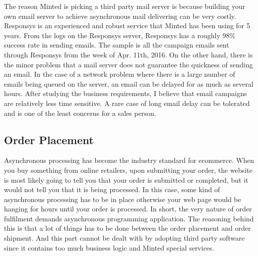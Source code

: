 \documentclass[12pt]{article}
\begin{document}
The reason Minted is picking a third party mail server is because building your own email server to achieve asynchronous mail delivering can be very costly. Responsys is an experienced and robust service that Minted has been using for 5 years. From the logs on the Responsys server, Responsys has a roughly 98\% success rate in sending emails. The sample is all the campaign emails sent through Responsys from the week of Apr. 11th, 2016. On the other hand, there is the minor problem that a mail server does not guarantee the quickness of sending an email. In the case of a network problem where there is a large number of emails being queued on the server, an email can be delayed for as much as several hours. After studying the business requirements, I believe that email campaigns are relatively less time sensitive. A rare case of long email delay can be tolerated and is one of the least concerns for a sales person.\\


\subsection{Order Placement}
Asynchronous processing has become the industry standard for ecommerce. When you buy something from online retailers, upon submitting your order, the website is most likely going to tell you that your order is submitted or completed, but it would not tell you that it is being processed. In this case, some kind of asynchronous processing has to be in place otherwise your web page would be hanging for hours until your order is processed. In short, the very nature of order fulfilment demands asynchronous programming application. The reasoning behind this is that a lot of things has to be done between the order placement and order shipment. And this part cannot be dealt with by adopting third party software since it contains too much business logic and Minted special services.\\
\end{document}
